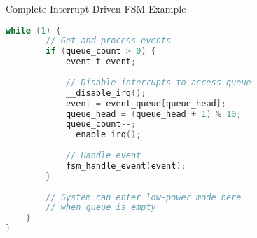 \begin{example2}{Complete Interrupt-Driven FSM Example}
\begin{lstlisting}[language=C, style=basesmol]
    while (1) {
        // Get and process events
        if (queue_count > 0) {
            event_t event;
            
            // Disable interrupts to access queue
            __disable_irq();
            event = event_queue[queue_head];
            queue_head = (queue_head + 1) % 10;
            queue_count--;
            __enable_irq();
            
            // Handle event
            fsm_handle_event(event);
        }
        
        // System can enter low-power mode here
        // when queue is empty
    }
}
\end{lstlisting}
\end{example2}